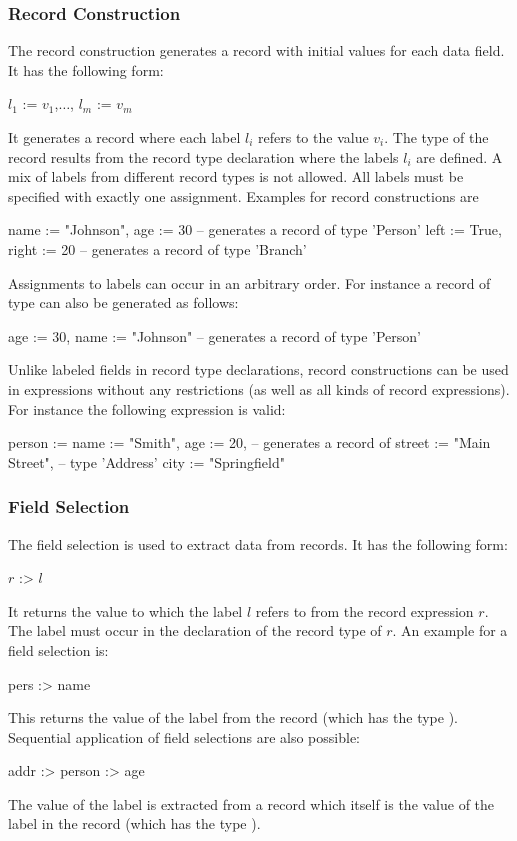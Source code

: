 \subsubsection{Record Construction}
\label{sec-recordconstr}

The record construction generates a record with initial values for
each data field. It has the following form:
\begin{curry}
{ $l_1$ := $v_1$,$\ldots$, $l_m$ := $v_m$ }
\end{curry}
It generates a record where each label $l_i$ refers to the
value $v_i$. The type of the record results from the record type
declaration where the labels $l_i$ are defined.
A mix of labels from different
record types is not allowed. All labels must be specified with
exactly one assignment. Examples for record constructions are
\begin{curry}
{name := "Johnson", age := 30}     -- generates a record of type 'Person'
{left := True, right := 20}        -- generates a record of type 'Branch'
\end{curry}
Assignments to labels can occur in an arbitrary order. For instance a
record of type  can also be generated as follows:
\begin{curry}
{age := 30, name := "Johnson"}     -- generates a record of type 'Person'
\end{curry}
Unlike labeled fields in record type declarations,
record constructions can be used in expressions without any restrictions
(as well as all kinds of record expressions). For instance the following
expression is valid:
\begin{curry}
{person := {name := "Smith", age := 20},   -- generates a record of
 street := "Main Street",                  -- type 'Address'
 city   := "Springfield"}
\end{curry}


\subsubsection{Field Selection}
\label{sec-fieldsel}

The field selection is used to extract data from records.
It has the following form:
\begin{curry}
$r$ :> $l$
\end{curry}
It returns the value to which the label $l$ refers to from the
record expression $r$. The label must occur in the declaration of
the record type of $r$.
An example for a field selection is:
\begin{curry}
pers :> name
\end{curry}
This returns the value of the label  from the record 
(which has the type ).
Sequential application of field selections are also possible:
\begin{curry}
addr :> person :> age
\end{curry}
The value of the label  is extracted from a record which itself
is the value of the label  in the record 
(which has the type ).


